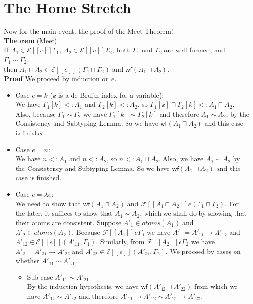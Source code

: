 \documentclass{article}
\newcommand{\SEM}[1]{[\![ #1 ]\!]}
\newcommand{\ESEM}[1]{\mathcal{E}\SEM{#1}}
\newcommand{\FSEM}[1]{\mathcal{F}\SEM{#1}}
\newcommand{\WF}[1]{\mathsf{wf}(#1)}
\newcommand{\ATOMS}[1]{\mathit{atoms}(#1)}
\begin{document}
\section{The Home Stretch}

Now for the main event, the proof of the Meet Theorem! \\

\noindent \textbf{Theorem} (Meet)\\
If $A_1 \in \ESEM{e}\Gamma_1$, $A_2 \in \ESEM{e}\Gamma_2$,
both $\Gamma_1$ and $\Gamma_2$ are well formed,
and $\Gamma_1 \sim \Gamma_2$, \\
then $A_1 \sqcap A_2 \in \ESEM{e}(\Gamma_1\sqcap\Gamma_2)$ and
  $\WF{A_1 \sqcap A_2}$. \\[1ex]
%
\textbf{Proof}
We proceed by induction on $e$.
\begin{itemize}
\item Case $e=k$ ($k$ is a de Bruijn index for a variable):\\
  We have $\Gamma_1[k] <: A_1$ and $\Gamma_2[k] <: A_2$,
  so $\Gamma_1[k] \sqcap \Gamma_2[k] <: A_1 \sqcap A_2$.
  Also, because $\Gamma_1 \sim \Gamma_2$ we have
  $\Gamma_1[k] \sim \Gamma_2[k]$ and therefore
  $A_1 \sim A_2$, by the Consistency and Subtyping Lemma.
  So we have $\WF{A_1 \sqcap A_2}$ and this case is finished.
  
\item Case $e=n$: \\
  We have $n <: A_1$ and $n <: A_2$, so $n <: A_1 \sqcap A_2$.
  Also, we have $A_1 \sim A_2$ by the Consistency and Subtyping Lemma.
  So we have $\WF{A_1 \sqcap A_2}$ and this case is finished.

\item Case $e=\lambda e$: \\
  We need to show that $\WF{A_1 \sqcap A_2}$ and
  $\FSEM{A_1 \sqcap A_2}e(\Gamma_1\sqcap\Gamma_2)$.
  For the later, it suffices to show that $A_1 \sim A_2$,
  which we shall do by showing that their atoms are consistent.
  Suppose $A'_1 \in \ATOMS{A_1}$ and $A'_2 \in \ATOMS{A_2}$.
  Because $\FSEM{A_1}e\Gamma_1$ 
  we have $A'_1 =A'_{11} \to A'_{12}$ and
  $A'_{12} \in \ESEM{e}(A'_{11},\Gamma_1)$. Similarly,
  from $\FSEM{A_2}e\Gamma_2$ we have
  $A'_2 =A'_{21} \to A'_{22}$ and $A'_{22} \in \ESEM{e}(A'_{21},\Gamma_2)$.
  We proceed by cases on whether $A'_{11} \sim A'_{21}$.
  \begin{itemize}
  \item Sub-case $A'_{11} \sim A'_{21}$:\\
    By the induction hypothesis, we have
    $\WF{A'_{12} \sqcap A'_{22}}$ from which we
    have $A'_{12} \sim A'_{22}$ and therefore
    $A'_{11}\to A'_{12} \sim A'_{21} \to A'_{22}$.
    

\end{itemize}
\end{itemize}
\end{document}
